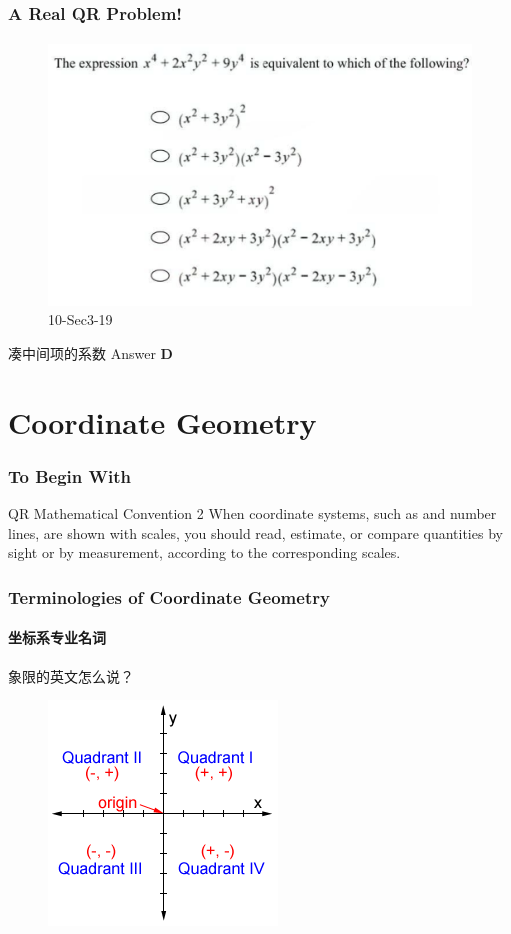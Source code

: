 \documentclass[
	11pt, %
	handout,
]{beamer}
\begin{document}
\begin{frame}
	\frametitle{A Real QR Problem!}
	\framesubtitle{}
	\begin{figure}
		\includegraphics[width=0.7\linewidth]{Algebra_Expression_Example_Question1.png}
		\caption{10-Sec3-19}
	\end{figure}
	\pause
 凑中间项的系数
\pause
\bigskip
Answer \textbf{D } 
\end{frame}

\section{Coordinate Geometry}
\begin{frame}
	\frametitle{To Begin With}
	\begin{block}{QR Mathematical Convention 2 }
		When coordinate systems, such as and number lines, are
shown with scales, you should read, estimate, or compare quantities by
sight or by measurement, \alert{according to the corresponding scales}.
	\end{block}
\end{frame}




\begin{frame}
	\frametitle{Terminologies of Coordinate Geometry}
	\framesubtitle{坐标系专业名词}
	{\LARGE 象限的英文怎么说？}
	\pause
	\begin{figure}
		\includegraphics[width=0.5\linewidth]{Signs_Of_Quadrant.png}
	\end{figure}
\end{frame}
\end{document}
